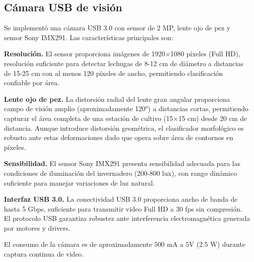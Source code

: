 \subsection{Cámara USB de visión}

Se implementó una cámara USB 3.0 con sensor de 2 MP, lente ojo de pez y sensor Sony IMX291. Las características principales son:

\textbf{Resolución.} El sensor proporciona imágenes de 1920×1080 píxeles (Full HD), resolución suficiente para detectar lechugas de 8-12 cm de diámetro a distancias de 15-25 cm con al menos 120 píxeles de ancho, permitiendo clasificación confiable por área.

\textbf{Lente ojo de pez.} La distorsión radial del lente gran angular proporciona campo de visión amplio (aproximadamente 120°) a distancias cortas, permitiendo capturar el área completa de una estación de cultivo (15×15 cm) desde 20 cm de distancia. Aunque introduce distorsión geométrica, el clasificador morfológico es robusto ante estas deformaciones dado que opera sobre área de contornos en píxeles.

\textbf{Sensibilidad.} El sensor Sony IMX291 presenta sensibilidad adecuada para las condiciones de iluminación del invernadero (200-800 lux), con rango dinámico suficiente para manejar variaciones de luz natural.

\textbf{Interfaz USB 3.0.} La conectividad USB 3.0 proporciona ancho de banda de hasta 5 Gbps, suficiente para transmitir video Full HD a 30 fps sin compresión. El protocolo USB garantiza robustez ante interferencia electromagnética generada por motores y drivers.

El consumo de la cámara es de aproximadamente 500 mA a 5V (2.5 W) durante captura continua de video.
